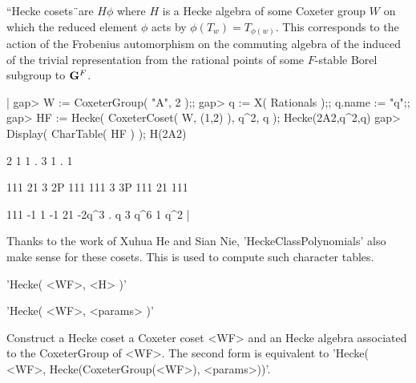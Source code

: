 

``Hecke  cosets\"\ are  $H\phi$  where $H$  is a   Hecke algebra  of some
Coxeter   group $W$  on   which   the  reduced  element $\phi$   acts  by
$\phi(T_w)=T_{\phi(w)}$.  This corresponds to the action of the Frobenius
automorphism on  the commuting  algebra  of  the induced of  the  trivial
representation from the rational points of some $F$-stable Borel subgroup
to ${\bf G}^F$.

|    gap> W := CoxeterGroup( "A", 2 );;
    gap> q := X( Rationals );; q.name := "q";;
    gap> HF := Hecke( CoxeterCoset( W, (1,2) ), q^2, q );
    Hecke(2A2,q^2,q)
    gap> Display( CharTable( HF ) );
    H(2A2)
    
         2     1   1   .
         3     1   .   1
    
             111  21   3
        2P   111 111   3
        3P   111  21 111
    
    111       -1   1  -1
    21     -2q^3   .   q
    3        q^6   1 q^2
    |

Thanks  to the work of Xuhua  He and Sian Nie, 'HeckeClassPolynomials' also
make sense for these cosets. This is used to compute such character tables.


'Hecke( <WF>, <H> )'

'Hecke( <WF>, <params> )'

Construct  a  Hecke coset  a Coxeter   coset  <WF> and  an Hecke  algebra
associated to the CoxeterGroup of <WF>. The  second form is equivalent to
'Hecke( <WF>, Hecke(CoxeterGroup(<WF>), <params>))'.



